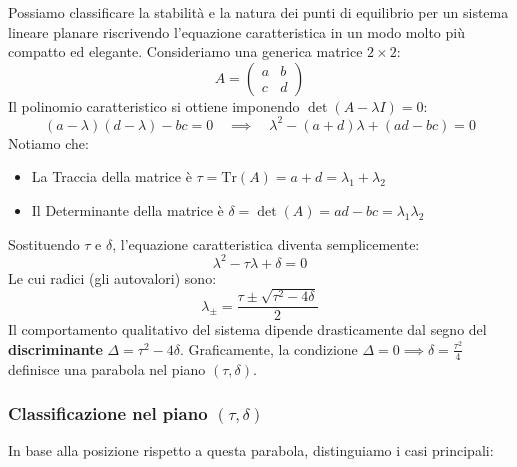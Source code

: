 \documentclass[openany]{book}
\theoremstyle{definition}
\theoremstyle{remark}
\begin{document}
Possiamo classificare la stabilità e la natura dei punti di equilibrio per un sistema lineare planare riscrivendo l'equazione caratteristica in un modo molto più compatto ed elegante. Consideriamo una generica matrice $2 \times 2$:
\begin{equation}
    A = \begin{pmatrix} a & b \\ c & d \end{pmatrix}
\end{equation}
Il polinomio caratteristico si ottiene imponendo $\det(A - \lambda I) = 0$:
\begin{equation}
    (a - \lambda)(d - \lambda) - bc = 0 \quad \implies \quad \lambda^2 - (a+d)\lambda + (ad - bc) = 0
\end{equation}
Notiamo che:
\begin{itemize}
    \item La Traccia della matrice è $\tau = \text{Tr}(A) = a + d = \lambda_1 + \lambda_2$
    \item Il Determinante della matrice è $\delta = \det(A) = ad - bc = \lambda_1 \lambda_2$
\end{itemize}
Sostituendo $\tau$ e $\delta$, l'equazione caratteristica diventa semplicemente:
\begin{equation}
    \lambda^2 - \tau \lambda + \delta = 0
\end{equation}
Le cui radici (gli autovalori) sono:
\begin{equation}
    \lambda_{\pm} = \frac{\tau \pm \sqrt{\tau^2 - 4\delta}}{2}
\end{equation}
Il comportamento qualitativo del sistema dipende drasticamente dal segno del \textbf{discriminante} $\Delta = \tau^2 - 4\delta$. Graficamente, la condizione $\Delta = 0 \implies \delta = \frac{\tau^2}{4}$ definisce una parabola nel piano $(\tau, \delta)$.

\subsubsection*{Classificazione nel piano $(\tau, \delta)$}

In base alla posizione rispetto a questa parabola, distinguiamo i casi principali:
\end{document}
